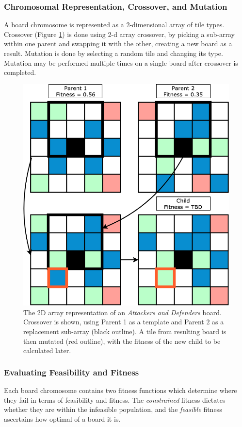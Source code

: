 \documentclass[letterpaper]{article} %
\begin{document}
\subsubsection{Chromosomal Representation, Crossover, and Mutation}
A board chromosome is represented as a 2-dimensional array of tile types. Crossover (Figure \ref{fig:map-crossover}) is done using 2-d array crossover, by picking a sub-array within one parent and swapping it with the other, creating a new board as a result. Mutation is done by selecting a random tile and changing its type. Mutation may be performed multiple times on a single board after crossover is completed.

\begin{figure}[h]
\begin{center}
\includegraphics[height=0.8\linewidth]{graphics/map-crossover.png}
\caption{The 2D array representation of an \textit{Attackers and Defenders} board. Crossover is shown, using Parent 1 as a template and Parent 2 as a replacement sub-array (black outline). A tile from resulting board is then mutated (red outline), with the fitness of the new child to be calculated later.}
\label{fig:map-crossover}
\end{center}
\end{figure}

\subsubsection{Evaluating Feasibility and Fitness}
Each board chromosome contains two fitness functions which determine where they fail in terms of feasibility and fitness. The \emph{constrained} fitness dictates whether they are within the infeasible population, and the \emph{feasible} fitness ascertains how optimal of a board it is.
\end{document}
